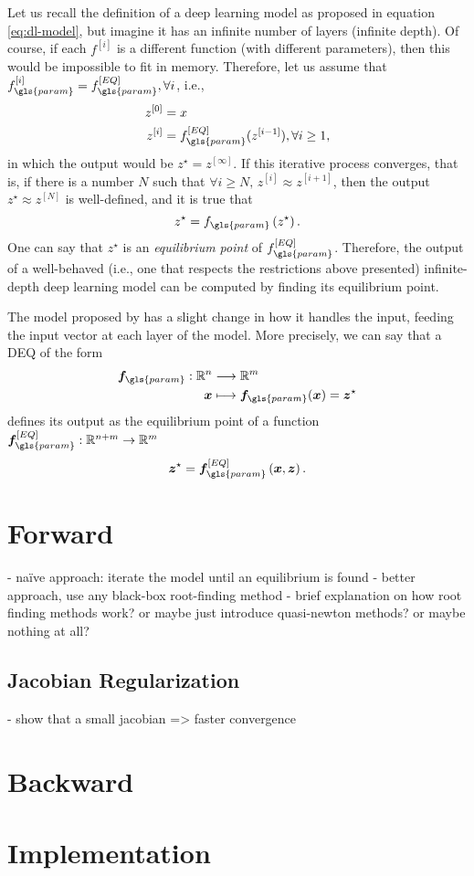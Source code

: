 Let us recall the definition of a deep learning model as proposed in equation \eqref{eq:dl-model}, but imagine it has an infinite number of layers (infinite depth).
Of course, if each $f^{[i]}$ is a different function (with different parameters), then this would be impossible to fit in memory.
Therefore, let us assume that $f_{\gls{param}}^{[i]}=f_{\gls{param}}^{[EQ]},\forall i$, i.e.,
\begin{equation*}
\begin{split}
    z^{[0]} &= x \\
    z^{[i]} &= f_{\gls{param}}^{[EQ]}(z^{[i-1]}), \forall i\ge 1
,\end{split}
\end{equation*}
in which the output would be $z^{\star} = z^{[\infty]}$.
If this iterative process converges, that is, if there is a number $N$ such that $\forall i\ge N,\,z^{[i]}\approx z^{[i+1]}$, then the output $z^{\star}\approx z^{[N]}$ is well-defined, and it is true that  \[
    z^{\star} = f_{\gls{param}}\left( z^{\star} \right) 
.\] 
One can say that $z^{\star}$ is an \emph{equilibrium point} of $f_{\gls{param}}^{[EQ]}$.
Therefore, the output of a well-behaved (i.e., one that respects the restrictions above presented) infinite-depth deep learning model can be computed by finding its equilibrium point.

The model proposed by \textcite{Bai2019} has a slight change in how it handles the input, feeding the input vector at each layer of the model. More precisely, we can say that a \gls{DEQ} of the form
\begin{align*}
    \bm{f}_{\gls{param}}: \R^{n} &\longrightarrow \R^{m} \\
    \bm{x} &\longmapsto \bm{f}_{\gls{param}}(\bm{x}) = \bm{z}^{\star}
\end{align*}
defines its output as the equilibrium point of a function $\bm{f}_{\gls{param}}^{[EQ]}:\R^{n+m}\to \R^{m}$
\begin{equation}\label{eq:z-star}
    \bm{z}^{\star} = \bm{f}_{\gls{param}}^{[EQ]}\left( \bm{x},\bm{z} \right) 
.\end{equation}

\section{Forward}

- naïve approach: iterate the model until an equilibrium is found
- better approach, use any black-box root-finding method
- brief explanation on how root finding methods work? or maybe just introduce quasi-newton methods? or maybe nothing at all?

\subsection{Jacobian Regularization}

- show that a small jacobian => faster convergence

\section{Backward}

\section{Implementation}

